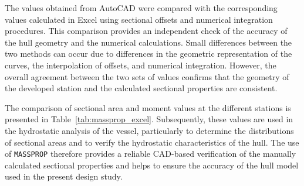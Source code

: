 \documentclass[12pt,a4paper,twoside]{report}
\begin{document}
\vspace{\baselineskip}\par\noindent The values obtained from AutoCAD were compared with the corresponding
values calculated in Excel using sectional offsets and numerical
integration procedures. This comparison provides an independent check of
the accuracy of the hull geometry and the numerical calculations. Small
differences between the two methods can occur due to differences in the
geometric representation of the curves, the interpolation of offsets, and
numerical integration. However, the overall agreement between the two sets
of values confirms that the geometry of the developed station and the calculated
sectional properties are consistent.

\vspace{\baselineskip}\par\noindent The comparison of sectional area and moment values at the different
stations is presented in Table~\ref{tab:massprop_excel}. Subsequently, these values are used in the hydrostatic analysis of the vessel, particularly
 to determine the distributions of sectional areas and to verify the
hydrostatic characteristics of the hull. The use of \texttt{MASSPROP}
therefore provides a reliable CAD-based verification of the manually
calculated sectional properties and helps to ensure the accuracy of the hull
model used in the present design study.
\end{document}

